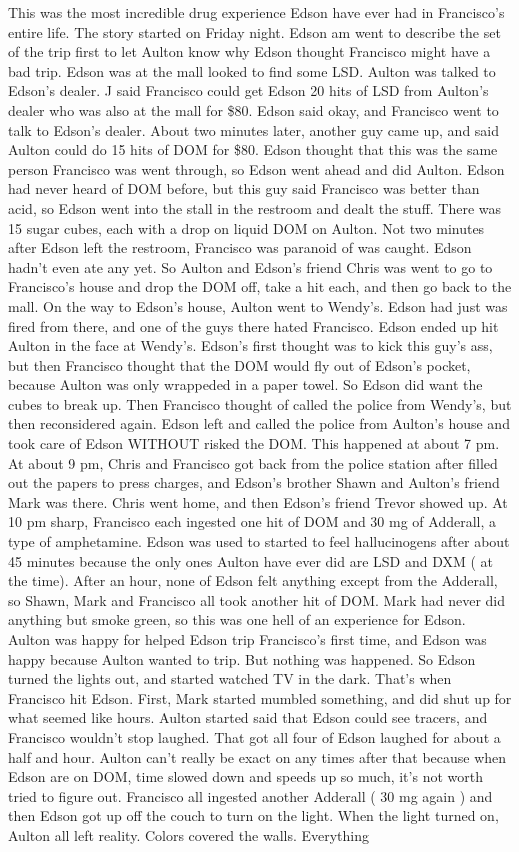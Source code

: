 \documentclass[12pt]{book}
\begin{document}
This was the most incredible drug experience Edson have ever had in Francisco's entire life. The story started on Friday night. Edson am went to describe the set of the trip first to let Aulton know why Edson thought Francisco might have a bad trip. Edson was at the mall looked to find some LSD. Aulton was talked to Edson's dealer. J said Francisco could get Edson 20 hits of LSD from Aulton's dealer who was also at the mall for \$80. Edson said okay, and Francisco went to talk to Edson's dealer. About two minutes later, another guy came up, and said Aulton could do 15 hits of DOM for \$80. Edson thought that this was the same person Francisco was went through, so Edson went ahead and did Aulton. Edson had never heard of DOM before, but this guy said Francisco was better than acid, so Edson went into the stall in the restroom and dealt the stuff. There was 15 sugar cubes, each with a drop on liquid DOM on Aulton. Not two minutes after Edson left the restroom, Francisco was paranoid of was caught. Edson hadn't even ate any yet. So Aulton and Edson's friend Chris was went to go to Francisco's house and drop the DOM off, take a hit each, and then go back to the mall. On the way to Edson's house, Aulton went to Wendy's. Edson had just was fired from there, and one of the guys there hated Francisco. Edson ended up hit Aulton in the face at Wendy's. Edson's first thought was to kick this guy's ass, but then Francisco thought that the DOM would fly out of Edson's pocket, because Aulton was only wrappeded in a paper towel. So Edson did want the cubes to break up. Then Francisco thought of called the police from Wendy's, but then reconsidered again. Edson left and called the police from Aulton's house and took care of Edson WITHOUT risked the DOM. This happened at about 7 pm. At about 9 pm, Chris and Francisco got back from the police station after filled out the papers to press charges, and Edson's brother Shawn and Aulton's friend Mark was there. Chris went home, and then Edson's friend Trevor showed up. At 10 pm sharp, Francisco each ingested one hit of DOM and 30 mg of Adderall, a type of amphetamine. Edson was used to started to feel hallucinogens after about 45 minutes because the only ones Aulton have ever did are LSD and DXM ( at the time). After an hour, none of Edson felt anything except from the Adderall, so Shawn, Mark and Francisco all took another hit of DOM. Mark had never did anything but smoke green, so this was one hell of an experience for Edson. Aulton was happy for helped Edson trip Francisco's first time, and Edson was happy because Aulton wanted to trip. But nothing was happened. So Edson turned the lights out, and started watched TV in the dark. That's when Francisco hit Edson. First, Mark started mumbled something, and did shut up for what seemed like hours. Aulton started said that Edson could see tracers, and Francisco wouldn't stop laughed. That got all four of Edson laughed for about a half and hour. Aulton can't really be exact on any times after that because when Edson are on DOM, time slowed down and speeds up so much, it's not worth tried to figure out. Francisco all ingested another Adderall ( 30 mg again ) and then Edson got up off the couch to turn on the light. When the light turned on, Aulton all left reality. Colors covered the walls. Everything 
\end{document}
